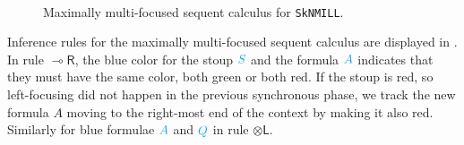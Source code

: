 \documentclass[runningheads]{llncs}
\newcommand{\tl}{\otimes \mathsf{L}}
\newcommand{\tr}{\otimes \mathsf{R}}
\newcommand{\lright}{{\multimap}\mathsf{R}}
\newcommand{\lleft}{{\multimap}\mathsf{L}}
\newcommand{\pass}{\mathsf{pass}}
\newcommand{\unitr}{\mathsf{IR}}
\newcommand{\otL}{\tl}
\newcommand{\otR}{\tr}
\newcommand{\lolliR}{\lright}
\newcommand{\lolliL}{\lleft}
\newcommand{\IR}{\unitr}
\newcommand{\ot}{\otimes}
\newcommand{\lolli}{\multimap}
\newcommand{\I}{\mathsf{I}}
\newcommand{\SkNMILL}{\texttt{SkNMILL}}
\newcommand{\red}[1]{{\color{Red}#1}}
\newcommand{\blue}[1]{{\color{Cerulean}#1}}
\newcommand{\green}[1]{{\color{Green}#1}}
\newcommand{\up}{\Uparrow}
\newcommand{\dn}{\Downarrow}
\newcommand{\blurL}{\mathsf{blur_L}}
\newcommand{\blurR}{\mathsf{blur_R}}
\newcommand{\unfoc}{\mathsf{unfoc}}
\begin{document}
\begin{figure}[t]
\[\begin{array}{c}
    \end{array}
  \]
  \caption{Maximally multi-focused sequent calculus for \SkNMILL.} 
  \label{fig:max-multi-focus}
\end{figure}

Inference rules for the maximally multi-focused sequent calculus are displayed in . In rule $\lolliR$, the blue color for the stoup $\blue{S}$ and the formula $\blue{A}$ indicates that they must have the same color, both green or both red. If the stoup is red, so left-focusing did not happen in the previous synchronous phase, we track the new formula $A$ moving to the right-most end of the context by making it also red.
Similarly for blue formulae $\blue{A}$ and $\blue{Q}$ in rule $\otL$.
\end{document}
